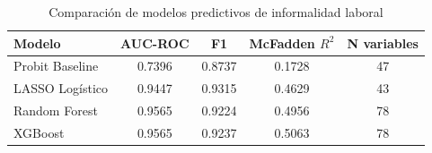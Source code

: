 \begin{table}[htbp]
\centering
\caption{Comparación de modelos predictivos de informalidad laboral}
\label{tab:modelos}
\begin{tabular}{lcccc}
\hline\hline
Modelo & AUC-ROC & F1 & McFadden $R^2$ & N variables \\
\hline
Probit Baseline & 0.7396 & 0.8737 & 0.1728 & 47 \\
LASSO Logístico & 0.9447 & 0.9315 & 0.4629 & 43 \\
Random Forest & 0.9565 & 0.9224 & 0.4956 & 78 \\
XGBoost & 0.9565 & 0.9237 & 0.5063 & 78 \\
\hline\hline
\end{tabular}
\end{table}